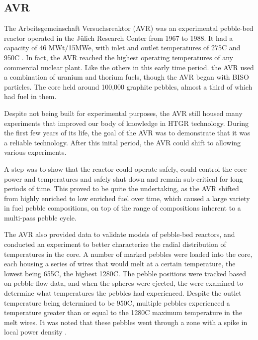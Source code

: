 \subsection{AVR}

The Arbeitsgemeinschaft Versuchsreaktor (AVR) was an experimental pebble-bed reactor operated in the Jülich Research Center from 1967 to 1988.  It had a capacity of 46 MWt/15MWe, with inlet and outlet temperatures of 275\textdegree  C and 950\textdegree  C \cite{beck_high_nodate}.  In fact, the AVR reached the highest operating temperatures of any commercial nuclear plant.  Like the others in this early time period. the AVR used a combination of uranium and thorium fuels, though the AVR began with BISO particles.  The core held around 100,000 graphite pebbles, almost a third of which had fuel in them.

Despite not being built for experimental purposes, the AVR still housed many experiments that improved our body of knowledge in HTGR technology.  During the first few years of its life, the goal of the AVR was to demonstrate that it was a reliable technology.  After this inital period, the AVR could shift to allowing various experiments.

A step was to show that the reactor could operate safely, could control the core power and temperatures and safely shut down and remain sub-critical for long periods of time.  This proved to be quite the undertaking, as the AVR shifted from highly enriched to low enriched fuel over time, which caused a large variety in fuel pebble compositions, on top of the range of compositions inherent to a multi-pass pebble cycle.

The AVR also provided data to validate models of pebble-bed reactors, and conducted an experiment to better characterize the radial distribution of temperatures in the core.  A number of marked pebbles were loaded into the core, each housing a series of wires that would melt at a certain temperature, the lowest being 655\textdegree  C, the highest 1280\textdegree  C.  The pebble positions were tracked based on pebble flow data, and when the spheres were ejected, the were examined to determine what temperatures the pebbles had experienced.  Despite the outlet temperature being determined to be 950\textdegree  C, multiple pebbles experienced a temperature greater than or equal to the 1280\textdegree C maximum temperature in the melt wires.  It was noted that these pebbles went through a zone with a spike in local power density \cite{noauthor_results_1990}.


